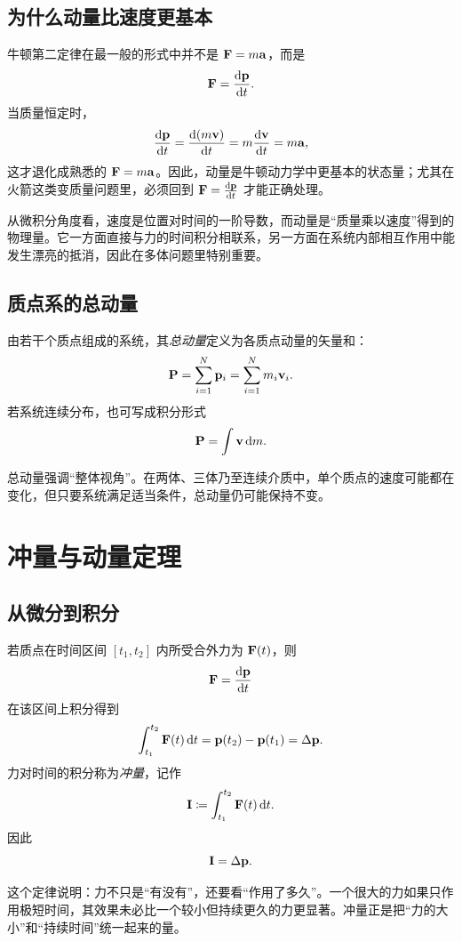 \subsection{为什么动量比速度更基本}

牛顿第二定律在最一般的形式中并不是 $\vb F=m\vb a$，而是
\[
\vb F=\dv{\vb p}{t}.
\]
当质量恒定时，
\[
\dv{\vb p}{t}=\dv{(m\vb{v})}{t}=m\dv{\vb v}{t}=m\vb a,
\]
这才退化成熟悉的 $\vb F=m\vb a$。因此，动量是牛顿动力学中更基本的状态量；尤其在火箭这类变质量问题里，必须回到 $\vb F=\dv{\vb p}{t}$ 才能正确处理。

\begin{remark}
从微积分角度看，速度是位置对时间的一阶导数，而动量是“质量乘以速度”得到的物理量。它一方面直接与力的时间积分相联系，另一方面在系统内部相互作用中能发生漂亮的抵消，因此在多体问题里特别重要。
\end{remark}

\subsection{质点系的总动量}

\begin{definition}
由若干个质点组成的系统，其\emph{总动量}定义为各质点动量的矢量和：
\[
\vb P=\sum_{i=1}^N \vb p_i=\sum_{i=1}^N m_i\vb v_i.
\]
若系统连续分布，也可写成积分形式
\[
\vb P=\int \vb v\,\dd m.
\]
\end{definition}

总动量强调“整体视角”。在两体、三体乃至连续介质中，单个质点的速度可能都在变化，但只要系统满足适当条件，总动量仍可能保持不变。

\section{冲量与动量定理}

\subsection{从微分到积分}

\begin{law}[动量定理]
若质点在时间区间 $[t_1,t_2]$ 内所受合外力为 $\vb F(t)$，则
\[
\vb F=\dv{\vb p}{t}
\]
在该区间上积分得到
\[
\int_{t_1}^{t_2}\vb F(t)\,\dd t=\vb p(t_2)-\vb p(t_1)=\Delta\vb p.
\]
力对时间的积分称为\emph{冲量}，记作
\[
\vb I\coloneqq \int_{t_1}^{t_2}\vb F(t)\,\dd t.
\]
因此
\[
\vb I=\Delta\vb p.
\]
\end{law}

这个定律说明：力不只是“有没有”，还要看“作用了多久”。一个很大的力如果只作用极短时间，其效果未必比一个较小但持续更久的力更显著。冲量正是把“力的大小”和“持续时间”统一起来的量。

